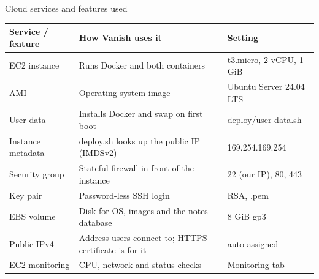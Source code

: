 \documentclass[aspectratio=169,11pt]{beamer}
\newcommand{\code}[1]{{\ttfamily\small #1}}
\begin{document}
\begin{frame}{Cloud services and features used}
  \small
  \begin{tabularx}{\textwidth}{@{}l X l@{}}
    \toprule
    \textbf{Service / feature} & \textbf{How Vanish uses it} & \textbf{Setting} \\
    \midrule
    EC2 instance        & Runs Docker and both containers                    & t3.micro, 2 vCPU, 1 GiB \\
    AMI                 & Operating system image                              & Ubuntu Server 24.04 LTS \\
    User data           & Installs Docker and swap on first boot              & \code{deploy/user-data.sh} \\
    Instance metadata   & \code{deploy.sh} looks up the public IP (IMDSv2)     & 169.254.169.254 \\
    Security group      & Stateful firewall in front of the instance          & 22 (our IP), 80, 443 \\
    Key pair            & Password-less SSH login                              & RSA, \code{.pem} \\
    EBS volume          & Disk for OS, images and the notes database          & 8 GiB gp3 \\
    Public IPv4         & Address users connect to; HTTPS certificate is for it & auto-assigned \\
    EC2 monitoring      & CPU, network and status checks                      & Monitoring tab \\
    \bottomrule
  \end{tabularx}
\end{frame}

\end{document}
